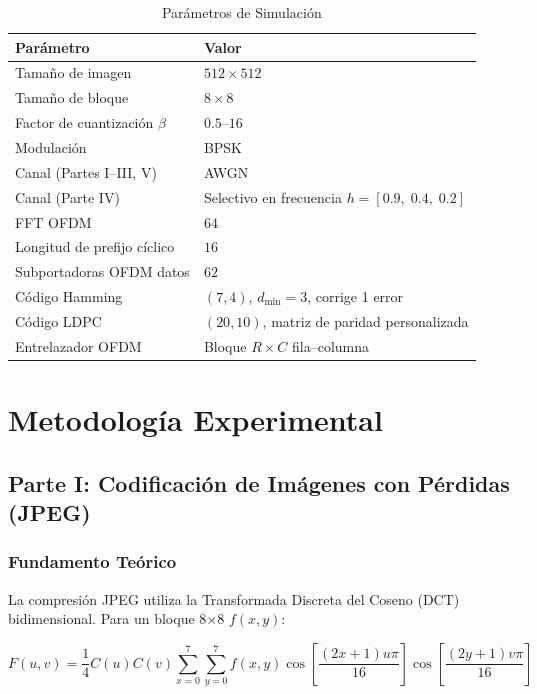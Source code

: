 \documentclass[12pt, a4paper]{article}
\begin{document}
\begin{table}[h]
\centering
\caption{Par\'ametros de Simulaci\'on}
\label{tab:params_es}
\begin{tabular}{ll}
\toprule
Par\'ametro & Valor \\
\midrule
Tama\~no de imagen & $512\times512$ \\
Tama\~no de bloque & $8\times8$ \\
Factor de cuantizaci\'on $\beta$ & $0.5$--$16$ \\
Modulaci\'on & BPSK \\
Canal (Partes I--III, V) & AWGN \\
Canal (Parte IV) & Selectivo en frecuencia $h=[0.9,\;0.4,\;0.2]$ \\
FFT OFDM & $64$ \\
Longitud de prefijo c\'iclico & $16$ \\
Subportadoras OFDM datos & $62$ \\
C\'odigo Hamming & $(7,4)$, $d_{\min}=3$, corrige 1 error \\
C\'odigo LDPC & $(20,10)$, matriz de paridad personalizada \\
Entrelazador OFDM & Bloque $R\times C$ fila--columna \\
\bottomrule
\end{tabular}
\end{table}

\section{Metodolog\'ia Experimental}

\subsection{Parte I: Codificaci\'on de Im\'agenes con P\'erdidas (JPEG)}

\subsubsection{Fundamento Te\'orico}

La compresi\'on JPEG utiliza la Transformada Discreta del Coseno (DCT) bidimensional. Para un bloque 8$\times$8 $f(x,y)$:

\begin{equation}
F(u,v)=\frac{1}{4}C(u)C(v)\sum_{x=0}^{7}\sum_{y=0}^{7}f(x,y)\cos\left[\frac{(2x+1)u\pi}{16}\right]\cos\left[\frac{(2y+1)v\pi}{16}\right]
\label{eq:dct_es}
\end{equation}
\end{document}
